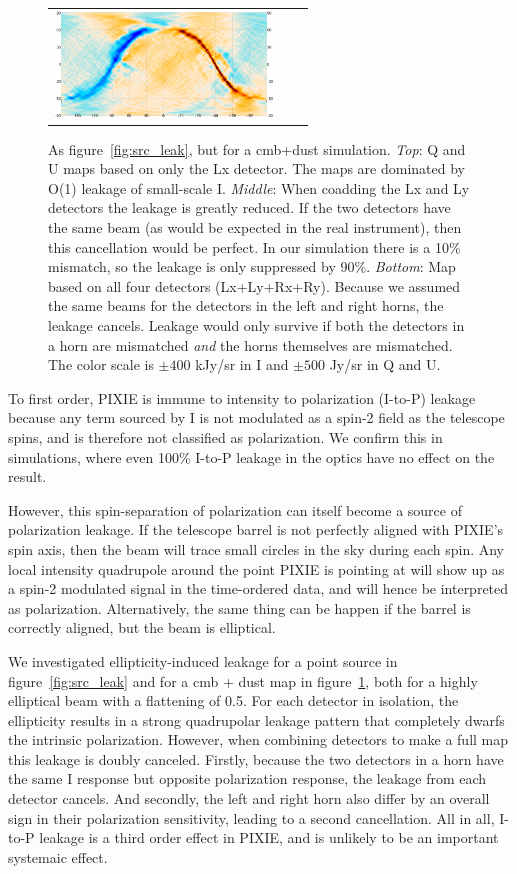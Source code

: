 \documentclass{article}
\begin{document}
\begin{figure}
\begin{tabular}{rm{54.4mm}m{56mm}}
		\includegraphics[height=28mm,clip,trim=7.5mm 8mm 0 0]{plots/ellip_mismatch_sky_sb_tot_map_2.png}
	\end{tabular}
	\caption{As figure~\ref{fig:src_leak}, but for a cmb+dust simulation.
	\emph{Top}: Q and U maps based on only the Lx detector.
	The maps are dominated by O(1) leakage of small-scale I. \emph{Middle}:
	When coadding the Lx and Ly detectors the leakage is greatly reduced. If
	the two detectors have the same beam (as would be expected in the real instrument),
	then this cancellation would be perfect. In our simulation there is a 10\% mismatch,
	so the leakage is only suppressed by 90\%. \emph{Bottom}: Map based on all
	four detectors (Lx+Ly+Rx+Ry). Because we assumed the same beams for the detectors
	in the left and right horns, the leakage cancels. Leakage would only survive if
	both the detectors in a horn are mismatched \emph{and} the horns themselves are
	mismatched. The color scale is $\pm 400$ kJy/sr in I and $\pm 500$ Jy/sr
	in Q and U.}
	\label{fig:cmb_leak}
\end{figure}
To first order, PIXIE is immune to intensity to polarization
(I-to-P) leakage because any term sourced by I is not
modulated as a spin-2 field as the telescope spins, and is
therefore not classified as polarization. We confirm this
in simulations, where even 100\% I-to-P leakage in the
optics have no effect on the result.

However, this spin-separation of polarization can itself
become a source of polarization leakage.
If the telescope barrel is not perfectly aligned with PIXIE's
spin axis, then the beam will trace small circles in the
sky during each spin. Any local intensity quadrupole around
the point PIXIE is pointing at will show up as a spin-2
modulated signal in the time-ordered data, and will hence
be interpreted as polarization. Alternatively, the same
thing can be happen if the barrel is correctly aligned,
but the beam is elliptical.

We investigated ellipticity-induced leakage for a
point source in figure~\ref{fig:src_leak} and for
a cmb + dust map in figure~\ref{fig:cmb_leak}, both
for a highly elliptical beam with a flattening of 0.5.
For each detector in isolation, the ellipticity results in a strong
quadrupolar leakage pattern that completely dwarfs the
intrinsic polarization. However, when combining
detectors to make a full map this leakage is doubly canceled.
Firstly, because the two detectors in a horn have the same
I response but opposite polarization response, the leakage
from each detector cancels. And secondly, the left and right
horn also differ by an overall sign in their polarization sensitivity,
leading to a second cancellation. All in all, I-to-P leakage
is a third order effect in PIXIE, and is unlikely to be an
important systemaic effect.
\end{document}
